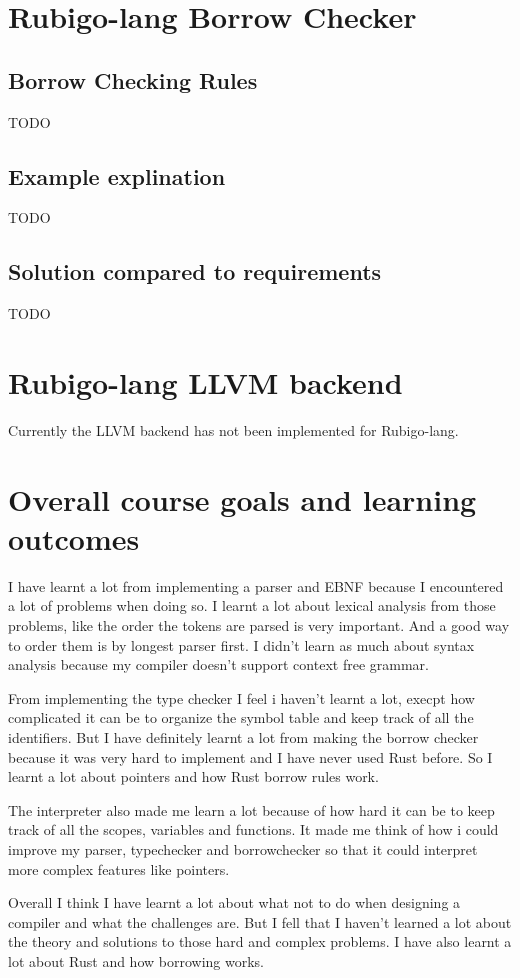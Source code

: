 \documentclass[12pt]{article}
\begin{document}
    \section{Rubigo-lang Borrow Checker}	
    	\subsection{Borrow Checking Rules}
 		TODO

	\subsection{Example explination}
 		TODO
    	
	\subsection{Solution compared to requirements}
 		TODO



    \section{Rubigo-lang LLVM backend}	
    	Currently the LLVM backend has not been implemented for Rubigo-lang.
	


    \section{Overall course goals and learning outcomes}
    	I have learnt a lot from implementing a parser and EBNF because I encountered a lot of problems when doing so. I learnt a lot about lexical analysis from those problems, like the order the tokens are parsed is very important. And a good way to order them is by longest parser first. I didn't learn as much about syntax analysis because my compiler doesn't support context free grammar.

	From implementing the type checker I feel i haven't learnt a lot, execpt how complicated it can be to organize the symbol table and keep track of all the identifiers. But I have definitely learnt a lot from making the borrow checker because it was very hard to implement and I have never used Rust before. So I learnt a lot about pointers and how Rust borrow rules work.

	The interpreter also made me learn a lot because of how hard it can be to keep track of all the scopes, variables and functions. It made me think of how i could improve my parser, typechecker and borrowchecker so that it could interpret more complex features like pointers.

	Overall I think I have learnt a lot about what not to do when designing a compiler and what the challenges are. But I fell that I haven't learned a lot about the theory and solutions to those hard and complex problems. I have also learnt a lot about Rust and how borrowing works.

	
\end{document}
